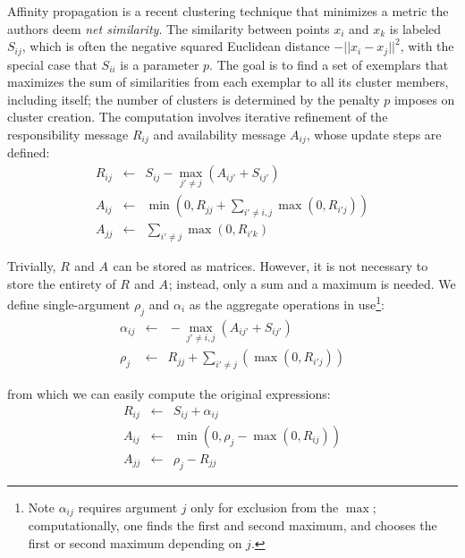 \documentclass[times, 10pt]{article}
\newcommand{\eqspace}{\!\!\!\!}
\newcommand{\respo}[2]{R_{#1#2}}
\newcommand{\avail}[2]{A_{#1#2}}
\newcommand{\simil}[2]{S_{#1#2}}
\newcommand{\frho}[1]{\rho_{#1}}
\newcommand{\falpha}[2]{\alpha_{#1#2}}
\begin{document}
Affinity propagation\cite{affinity} is a recent clustering technique that minimizes a metric the authors deem {\it net similarity}.
The similarity between points $x_i$ and $x_k$ is labeled $\simil{i}{j}$, which is often the negative squared Euclidean distance $-||x_i - x_j||^2$, with the special case that $\simil{i}{i}$ is a parameter $p$.
The goal is to find a set of exemplars that maximizes the sum of similarities from each exemplar to all its cluster members, including itself; the number of clusters is determined by the penalty $p$ imposes on cluster creation.
The computation involves iterative refinement of the responsibility message $\respo{i}{j}$ and availability message $\avail{i}{j}$, whose update steps are defined:
\begin{eqnarray*}
  \respo{i}{j} \eqspace&\gets&\eqspace \simil{i}{j} - \max_{j' \neq j} (\avail{i}{j'} + \simil{i}{j'})
  \\
  \avail{i}{j} \eqspace&\gets&\eqspace \min \! \left(\! 0, \respo{j}{j} + \sum_{i' \neq i,j} \max(0, \respo{i'}{j})\!\right)
  \\
  \avail{j}{j} \eqspace&\gets&\eqspace \sum_{i' \neq j} \max(0, \respo{i'}{k})
\end{eqnarray*}


\noindent Trivially, $\respo{}{}$ and $\avail{}{}$ can be stored as matrices.
However, it is not necessary to store the entirety of $\respo{}{}$ and $\avail{}{}$; instead, only a sum and a maximum is needed.
We define single-argument $\frho{j}$ and $\falpha{i}{}$ as the aggregate operations in use\footnote{
Note $\falpha{i}{j}$ requires argument $j$ only for exclusion from the $\max$; computationally, one finds the first and second maximum, and chooses the first or second maximum depending on $j$.}:
\begin{eqnarray*}
  \falpha{i}{j} \eqspace&\gets&\eqspace - \max_{j' \neq i,j} (\avail{i}{j'} + \simil{i}{j'})
  \\
  \frho{j} \eqspace&\gets&\eqspace \respo{j}{j} + \sum_{i' \neq j} \left( \max(0, \respo{i'}{j}) \right)
\end{eqnarray*}

\noindent from which we can easily compute the original expressions:
\begin{eqnarray*}
  \respo{i}{j} \eqspace&\gets&\eqspace \simil{i}{j} + \falpha{i}{j}
  \\
  \avail{i}{j} \eqspace&\gets&\eqspace \min \left(0, \frho{j} - \max(0, \respo{i}{j}) \right)
  \\
  \avail{j}{j} \eqspace&\gets&\eqspace \frho{j} - \respo{j}{j}
\end{eqnarray*}
\end{document}
